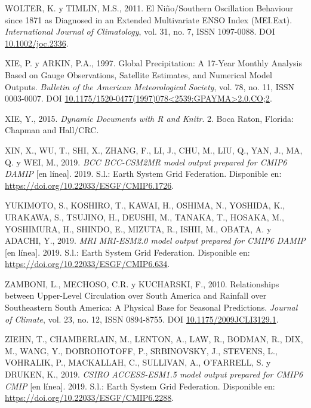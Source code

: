 \documentclass[12pt,oneside,a4paper]{reedthesis}
\newlength{\cslhangindent}
\newenvironment{CSLReferences}[2] %
 {%
  \setlength{\parindent}{0pt}
  \ifodd #1 \everypar{\setlength{\hangindent}{\cslhangindent}}\ignorespaces\fi
  \ifnum #2 > 0
  \setlength{\parskip}{#2\baselineskip}
  \fi
 }%
 {}
\begin{document}
\begin{CSLReferences}{1}{0}
\leavevmode{}%
WOLTER, K. y TIMLIN, M.S., 2011. El {Ni{ñ}o}/{Southern Oscillation} Behaviour since 1871 as Diagnosed in an Extended Multivariate {ENSO} Index ({MEI}.Ext). \emph{International Journal of Climatology}, vol. 31, no. 7, ISSN 1097-0088. DOI \href{https://doi.org/10.1002/joc.2336}{10.1002/joc.2336}.

\leavevmode{}%
XIE, P. y ARKIN, P.A., 1997. Global {Precipitation}: {A} 17-{Year Monthly Analysis Based} on {Gauge Observations}, {Satellite Estimates}, and {Numerical Model Outputs}. \emph{Bulletin of the American Meteorological Society}, vol. 78, no. 11, ISSN 0003-0007. DOI \href{https://doi.org/10.1175/1520-0477(1997)078\%3C2539:GPAYMA\%3E2.0.CO;2}{10.1175/1520-0477(1997)078\textless2539:GPAYMA\textgreater2.0.CO;2}.

\leavevmode{}%
XIE, Y., 2015. \emph{Dynamic Documents with {R} and Knitr}. 2. {Boca Raton, Florida}: {Chapman and Hall/CRC}.

\leavevmode{}%
XIN, X., WU, T., SHI, X., ZHANG, F., LI, J., CHU, M., LIU, Q., YAN, J., MA, Q. y WEI, M., 2019. \emph{BCC BCC-CSM2MR model output prepared for CMIP6 DAMIP} {[}en línea{]}. 2019. S.l.: Earth System Grid Federation. Disponible en: \url{https://doi.org/10.22033/ESGF/CMIP6.1726}.

\leavevmode{}%
YUKIMOTO, S., KOSHIRO, T., KAWAI, H., OSHIMA, N., YOSHIDA, K., URAKAWA, S., TSUJINO, H., DEUSHI, M., TANAKA, T., HOSAKA, M., YOSHIMURA, H., SHINDO, E., MIZUTA, R., ISHII, M., OBATA, A. y ADACHI, Y., 2019. \emph{MRI MRI-ESM2.0 model output prepared for CMIP6 DAMIP} {[}en línea{]}. 2019. S.l.: Earth System Grid Federation. Disponible en: \url{https://doi.org/10.22033/ESGF/CMIP6.634}.

\leavevmode{}%
ZAMBONI, L., MECHOSO, C.R. y KUCHARSKI, F., 2010. Relationships between {Upper-Level Circulation} over {South America} and {Rainfall} over {Southeastern South America}: {A Physical Base} for {Seasonal Predictions}. \emph{Journal of Climate}, vol. 23, no. 12, ISSN 0894-8755. DOI \href{https://doi.org/10.1175/2009JCLI3129.1}{10.1175/2009JCLI3129.1}.

\leavevmode{}%
ZIEHN, T., CHAMBERLAIN, M., LENTON, A., LAW, R., BODMAN, R., DIX, M., WANG, Y., DOBROHOTOFF, P., SRBINOVSKY, J., STEVENS, L., VOHRALIK, P., MACKALLAH, C., SULLIVAN, A., O'FARRELL, S. y DRUKEN, K., 2019. \emph{CSIRO ACCESS-ESM1.5 model output prepared for CMIP6 CMIP} {[}en línea{]}. 2019. S.l.: Earth System Grid Federation. Disponible en: \url{https://doi.org/10.22033/ESGF/CMIP6.2288}.


\end{CSLReferences}
\end{document}
